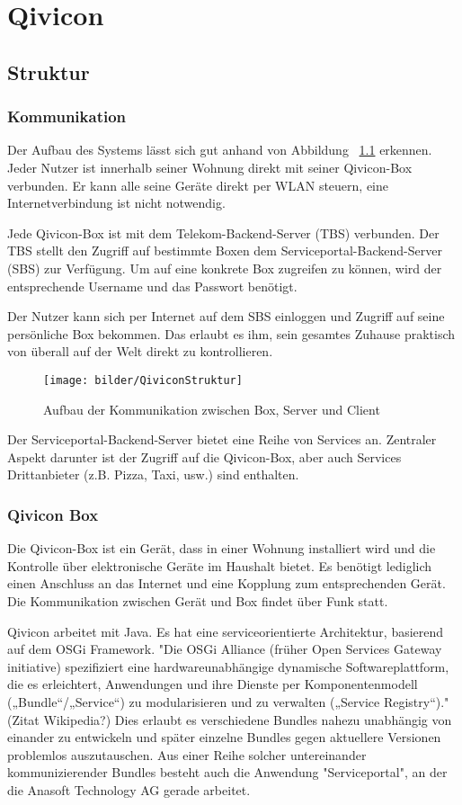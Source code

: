 \chapter{Qivicon}
\section{Struktur}
\subsection{Kommunikation}
Der Aufbau des Systems lässt sich gut anhand von Abbildung ~\ref{QiviconStruktur} erkennen. Jeder Nutzer ist innerhalb seiner Wohnung direkt mit seiner Qivicon-Box verbunden. Er kann alle seine Geräte direkt per WLAN steuern, eine Internetverbindung ist nicht notwendig. 

Jede Qivicon-Box ist mit dem Telekom-Backend-Server (TBS) verbunden. Der TBS stellt den Zugriff auf bestimmte Boxen dem Serviceportal-Backend-Server (SBS) zur Verfügung. Um auf eine konkrete Box zugreifen zu können, wird der entsprechende Username und das Passwort benötigt.

Der Nutzer kann sich per Internet auf dem SBS einloggen und Zugriff auf seine persönliche Box bekommen. Das erlaubt es ihm, sein gesamtes Zuhause praktisch von überall auf der Welt direkt zu kontrollieren.

\begin{figure}
	\centering
  	\texttt{[image: bilder/QiviconStruktur]}
	\caption{Aufbau der Kommunikation zwischen Box, Server und Client}
	\label{QiviconStruktur}
\end{figure}

Der Serviceportal-Backend-Server bietet eine Reihe von Services an. Zentraler Aspekt darunter ist der Zugriff auf die Qivicon-Box, aber auch Services Drittanbieter (z.B. Pizza, Taxi, usw.) sind enthalten. 

\subsection{Qivicon Box}
Die Qivicon-Box ist ein Gerät, dass in einer Wohnung installiert wird und die Kontrolle über elektronische Geräte im Haushalt bietet. Es benötigt lediglich einen Anschluss an das Internet und eine Kopplung zum entsprechenden Gerät. Die Kommunikation zwischen Gerät und Box findet über Funk statt.

Qivicon arbeitet mit Java. Es hat eine serviceorientierte Architektur, basierend auf dem OSGi Framework. 
"Die OSGi Alliance (früher Open Services Gateway initiative) spezifiziert eine hardwareunabhängige dynamische Softwareplattform, die es erleichtert, Anwendungen und ihre Dienste per Komponentenmodell („Bundle“/„Service“) zu modularisieren und zu verwalten („Service Registry“)." (Zitat Wikipedia?)
Dies erlaubt es verschiedene Bundles nahezu unabhängig von einander zu entwickeln und später einzelne Bundles gegen aktuellere Versionen problemlos auszutauschen. Aus einer Reihe solcher untereinander kommunizierender Bundles besteht auch die Anwendung "Serviceportal", an der die Anasoft Technology AG gerade arbeitet.

